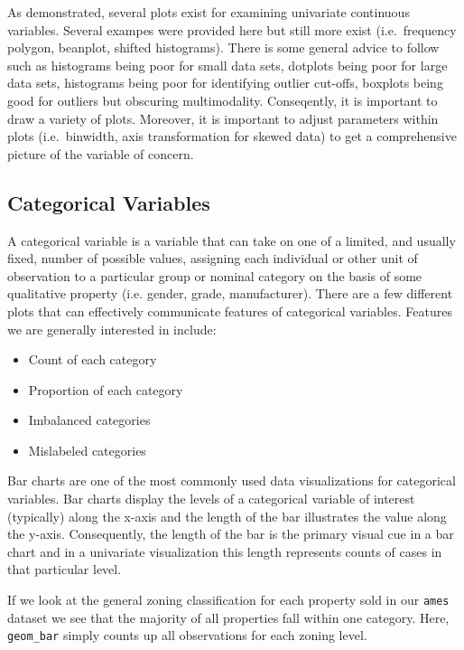 \documentclass[]{article}
\providecommand{\tightlist}{%
  \setlength{\itemsep}{0pt}\setlength{\parskip}{0pt}}
\begin{document}
As demonstrated, several plots exist for examining univariate continuous
variables. Several exampes were provided here but still more exist
(i.e.~frequency polygon, beanplot, shifted histograms). There is some
general advice to follow such as histograms being poor for small data
sets, dotplots being poor for large data sets, histograms being poor for
identifying outlier cut-offs, boxplots being good for outliers but
obscuring multimodality. Conseqently, it is important to draw a variety
of plots. Moreover, it is important to adjust parameters within plots
(i.e.~binwidth, axis transformation for skewed data) to get a
comprehensive picture of the variable of concern.

\subsection{Categorical Variables}\label{categorical-variables}

A categorical variable is a variable that can take on one of a limited,
and usually fixed, number of possible values, assigning each individual
or other unit of observation to a particular group or nominal category
on the basis of some qualitative property (i.e. gender, grade,
manufacturer). There are a few different plots that can effectively
communicate features of categorical variables. Features we are generally
interested in include:

\begin{itemize}
\tightlist
\item
  Count of each category
\item
  Proportion of each category
\item
  Imbalanced categories
\item
  Mislabeled categories
\end{itemize}

Bar charts are one of the most commonly used data visualizations for
categorical variables. Bar charts display the levels of a categorical
variable of interest (typically) along the x-axis and the length of the
bar illustrates the value along the y-axis. Consequently, the length of
the bar is the primary visual cue in a bar chart and in a univariate
visualization this length represents counts of cases in that particular
level.

If we look at the general zoning classification for each property sold
in our \texttt{ames} dataset we see that the majority of all properties
fall within one category. Here, \texttt{geom\_bar} simply counts up all
observations for each zoning level.
\end{document}
